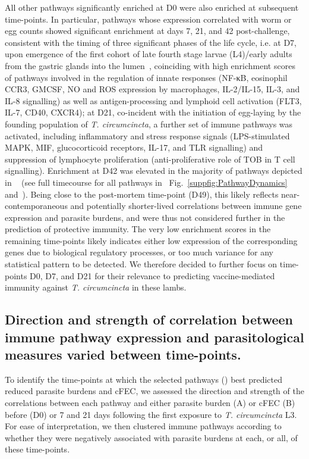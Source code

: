 \documentclass[a4paper, hidelinks, 11pt]{article}
\begin{document}

All other pathways significantly enriched at D0 were also enriched at
subsequent time-points. In particular, pathways whose expression correlated
with worm or egg counts showed significant enrichment at days 7, 21, and 42
post-challenge, consistent with the timing of three significant phases of the
life cycle, i.e. at D7, upon emergence of the first cohort of late fourth stage
larvae (L4)/early adults from the gastric glands into the
lumen~\supercite{Denham1969, McNeilly2017}, coinciding with high enrichment scores
of pathways involved in the regulation of innate responses (NF-κB, eosinophil
CCR3, GMCSF, NO and ROS expression by macrophages, IL-2/IL-15, IL-3, and IL-8
signalling) as well as antigen-processing and lymphoid cell activation (FLT3,
IL-7, CD40, CXCR4); at D21, co-incident with the initiation of egg-laying by
the founding population of \emph{T. circumcincta}, a further set of immune
pathways was activated, including inflammatory and stress response signals
(LPS-stimulated MAPK, MIF, glucocorticoid receptors, IL-17, and TLR signalling)
and suppression of lymphocyte proliferation (anti-proliferative role of TOB in
T cell signalling). Enrichment at D42 was elevated in the majority of pathways
depicted in ~ (see full timecourse for all pathways in
~Fig.~\ref{suppfig:PathwayDynamics} and~). Being close to
the post-mortem time-point (D49), this likely reflects near-contemporaneous and
potentially shorter-lived correlations between immune gene expression and
parasite burdens, and were thus not considered further in the prediction of
protective immunity. The very low enrichment scores in the remaining
time-points likely indicates either low expression of the corresponding genes
due to biological regulatory processes, or too much variance for any
statistical pattern to be detected. We therefore decided to further focus on
time-points D0, D7, and D21 for their relevance to predicting vaccine-mediated
immunity against \emph{T. circumcincta} in these lambs.

\subsection{Direction and strength of correlation between immune pathway
expression and parasitological measures varied between time-points.}

To identify the time-points at which the selected pathways
() best predicted reduced parasite burdens and cFEC, we
assessed the direction and strength of the correlations between each pathway
and either parasite burden (A) or cFEC
(B) before (D0) or 7 and 21 days following the first
exposure to \emph{T. circumcincta} L3. For ease of interpretation, we then
clustered immune pathways according to whether they were negatively associated
with parasite burdens at each, or all, of these time-points.
\end{document}
